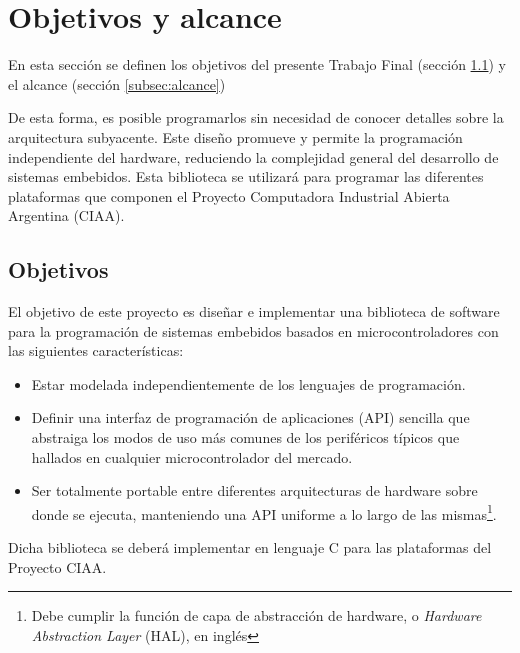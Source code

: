\section{Objetivos y alcance}
\label{sec:objetivosAlance}

En esta sección se definen los objetivos del presente Trabajo Final (sección \ref{subsec:objetivos}) y el alcance (sección \ref{subsec:alcance}) 

De esta forma, es posible programarlos sin necesidad de conocer detalles sobre
la arquitectura subyacente. Este diseño promueve y permite la programación 
independiente del hardware, reduciendo la complejidad general del desarrollo de
sistemas embebidos. Esta biblioteca se utilizará para programar las diferentes
plataformas que componen el Proyecto Computadora Industrial Abierta Argentina 
(CIAA).

\subsection{Objetivos}
\label{subsec:objetivos}

El objetivo de este proyecto es diseñar e implementar una biblioteca de
software para la programación de sistemas embebidos basados en
microcontroladores con las siguientes características: 

\begin{itemize}
   \item Estar modelada independientemente de los lenguajes de programación.
   \item Definir una interfaz de programación de aplicaciones (API) sencilla que abstraiga los modos de uso más comunes de los periféricos típicos que hallados en cualquier microcontrolador del mercado. 
   \item Ser totalmente portable entre diferentes arquitecturas de hardware sobre donde se ejecuta, manteniendo una API uniforme a lo largo de las mismas\footnote{Debe cumplir la función de capa de abstracción de hardware, o \textit{Hardware Abstraction Layer} (HAL),  en inglés}.
\end{itemize}

Dicha biblioteca se deberá implementar en lenguaje C para las plataformas del
Proyecto CIAA.


